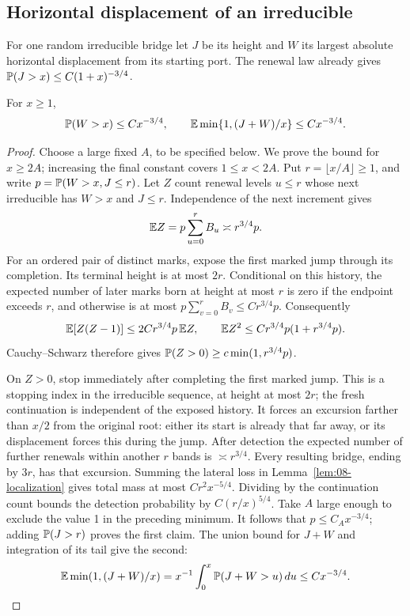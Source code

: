 \subsection{Horizontal displacement of an irreducible}
For one random irreducible bridge let \(J\) be its height and \(W\)
its largest absolute horizontal displacement from its starting port.
The renewal law already gives \(\mathbb P(J>x)\le C(1+x)^{-3/4}\).

\begin{lemma}\label{09_fast_paths:jump-tail}
For \(x\ge1\),
\[
 \mathbb P(W>x)\le Cx^{-3/4},\qquad
 \mathbb E\min\{1,(J+W)/x\}\le Cx^{-3/4}.
\]
\end{lemma}
\begin{proof}
Choose a large fixed \(A\), to be specified below. We prove the bound
for \(x\ge2A\); increasing the final constant covers \(1\le x<2A\).
Put \(r=\lfloor x/A\rfloor\ge1\), and write
\(p=\mathbb P(W>x,J\le r)\).  Let \(Z\) count renewal levels \(u\le r\) whose next irreducible
has \(W>x\) and \(J\le r\). Independence of the next increment gives
\[
 \mathbb E Z=p\sum_{u=0}^r B_u\asymp r^{3/4}p.
\]
For an ordered pair of distinct marks, expose the first marked jump
through its completion. Its terminal height is at most \(2r\).
Conditional on this history, the expected number of later marks born
at height at most \(r\) is zero if the endpoint exceeds \(r\), and
otherwise is at most \(p\sum_{v=0}^r B_v\le Cr^{3/4}p\).
Consequently
\[
 \mathbb E[Z(Z-1)]\le 2Cr^{3/4}p\,\mathbb E Z,
 \qquad \mathbb E Z^2\le Cr^{3/4}p(1+r^{3/4}p).
\]
Cauchy--Schwarz therefore gives
\(\mathbb P(Z>0)\ge c\min(1,r^{3/4}p)\).

On \(Z>0\), stop immediately after completing the first marked jump.
This is a stopping index in the irreducible sequence, at height at most
\(2r\); the fresh continuation is independent of the exposed history.
It forces an excursion farther than \(x/2\) from the original root:
either its start is already that far away, or its displacement forces
this during the jump.  After detection the expected number of further
renewals within another \(r\) bands is \(\asymp r^{3/4}\).
Every resulting bridge, ending by \(3r\), has that excursion.  Summing
the lateral loss in Lemma~\ref{lem:08-localization} gives total mass
at most \(Cr^2x^{-5/4}\).  Dividing by the continuation count bounds
the detection probability by \(C(r/x)^{5/4}\).  Take \(A\) large
enough to exclude the value 1 in the preceding minimum.  It follows
that \(p\le C_Ax^{-3/4}\); adding \(\mathbb P(J>r)\) proves the
first claim.  The union bound for \(J+W\) and integration of its tail
give the second:
\[
 \mathbb E\min(1,(J+W)/x)
 =x^{-1}\int_0^x\mathbb P(J+W>u)\,du\le Cx^{-3/4}.
\]
\end{proof}


